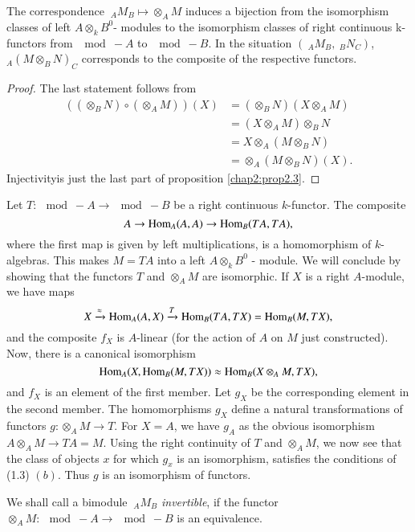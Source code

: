 \begin{theorem} \label{chap2:thm3.1}%
 The correspondence $~_A M_B \mapsto \otimes_A M$
  induces a bijection from the isomorphism classes of left $A \otimes
  _k B^0$- modules to the isomorphism classes of right continuous
  k-functors from $\mod - A$ to $\mod - B$. In the situation $(~_A
  M_B, ~_BN_C)$, $_A(M \otimes_B N)_C$ corresponds to the composite
  of the respective functors.  
\end{theorem}

\begin{proof}
The last statement follows from 
\begin{align*}
(( \otimes_B N) \circ  (\otimes_A M)) (X) & = (\otimes_B N) (X
  \otimes_A M) \\ 
& = (X \otimes_A M) \otimes_B N \\
& =  X \otimes_A (M \otimes_BN) \\
& = \otimes_A (M \otimes_B N) (X). 
\end{align*}
Injectivity\pageoriginale is just the last part of proposition
\ref{chap2:prop2.3}.  
\end{proof}

Let $T: \mod- A  \to \mod - B$  be a right continuous $k$-functor. The
composite  
$$
A \to \operatorname{Hom}_A (A, A) \to \operatorname{Hom} _B (TA, TA), 
$$
where the first map is given by left multiplications, is a
homomorphism of $k$-algebras. This makes $M = TA$ into a left $A
\otimes_k B^0$ - module. We will conclude by showing that the
functors $T$ and $\otimes_A M$ are isomorphic. If $X$ is a right
$A$-module, we have maps  
$$ 
X \xrightarrow{\approx} \operatorname{Hom}_A (A, X ) \xrightarrow{T} \operatorname{Hom}_B (TA, TX) =
\operatorname{Hom}_B (M, TX),  
$$
and the composite $f_X$ is $A$-linear (for the action of $A$ on $M$ just
constructed). Now, there is a canonical isomorphism 
$$
\operatorname{Hom}_A (X, \operatorname{Hom}_B (M, TX)) \approx \operatorname{Hom}_B (X \otimes_A M, TX),
$$
and $f_X$ is an element of the first member. Let $g_X$ be the
corresponding element in the second member. The homomorphisms $g_X$
define a natural transformations of functors $g : \otimes_A M \to
T$. For $X = A$, we have $g_A$ as the obvious isomorphism $A \otimes
_A M \to TA = M$. Using the right continuity of $T$ and $\otimes_A M$,
we now see that the class of objects $x$ for which $g_x$ is an
isomorphism, satisfies the conditions of (1.3) $(b)$. Thus $g$ is an
isomorphism of functors.  

\setcounter{definition}{1}
\begin{definition}\label{chap2:def3.2}%
We shall call a bimodule $~_AM_B$ {\em invertible}, if the functor
$\otimes_A M : \mod - A \to \mod -B$ is an equivalence.  
\end{definition}

